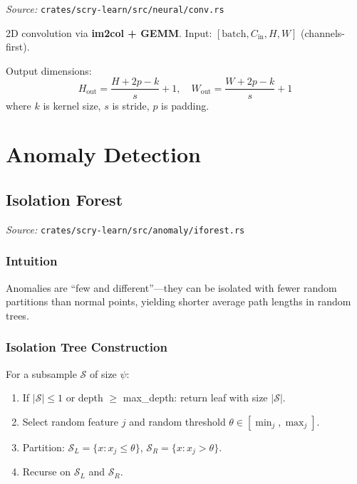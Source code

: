 \documentclass[11pt,a4paper]{article}
\theoremstyle{definition}
\theoremstyle{remark}
\begin{document}
\noindent\textit{Source:} \texttt{crates/scry-learn/src/neural/conv.rs}

2D convolution via \textbf{im2col + GEMM}. Input: $[\text{batch}, C_{\text{in}}, H, W]$ (channels-first).

Output dimensions:
\begin{equation}
H_{\text{out}} = \frac{H + 2p - k}{s} + 1, \quad W_{\text{out}} = \frac{W + 2p - k}{s} + 1
\end{equation}
where $k$ is kernel size, $s$ is stride, $p$ is padding.


\section{Anomaly Detection}

\subsection{Isolation Forest}
\label{sec:iforest}

\noindent\textit{Source:} \texttt{crates/scry-learn/src/anomaly/iforest.rs}

\subsubsection*{Intuition}

Anomalies are ``few and different''---they can be isolated with fewer random partitions than normal points, yielding shorter average path lengths in random trees.

\subsubsection*{Isolation Tree Construction}

For a subsample $\mathcal{S}$ of size $\psi$:
\begin{enumerate}[label=\arabic*., itemsep=0pt]
\item If $|\mathcal{S}| \leq 1$ or depth $\geq$ max\_depth: return leaf with size $|\mathcal{S}|$.
\item Select random feature $j$ and random threshold $\theta \in [\min_j, \max_j]$.
\item Partition: $\mathcal{S}_L = \{x : x_j \leq \theta\}$, $\mathcal{S}_R = \{x : x_j > \theta\}$.
\item Recurse on $\mathcal{S}_L$ and $\mathcal{S}_R$.
\end{enumerate}
\end{document}
